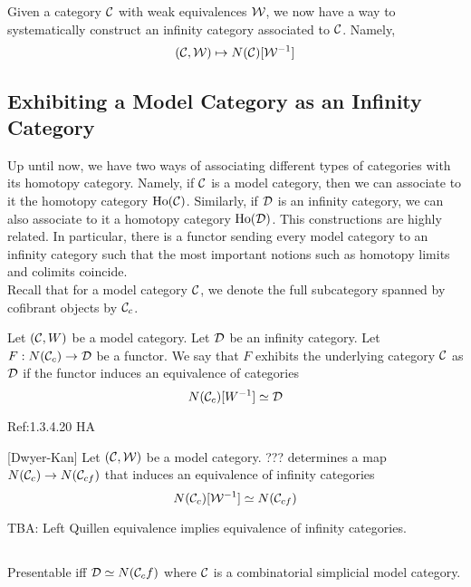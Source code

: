 \documentclass[a4paper]{article}
\begin{document}
Given a category $\mathcal{C}$ with weak equivalences $\mathcal{W}$, we now have a way to systematically construct an infinity category associated to $\mathcal{C}$. Namely, $$(\mathcal{C},\mathcal{W})\mapsto N(\mathcal{C})[\mathcal{W}^{-1}]$$

\subsection{Exhibiting a Model Category as an Infinity Category}
Up until now, we have two ways of associating different types of categories with its homotopy category. Namely, if $\mathcal{C}$ is a model category, then we can associate to it the homotopy category $\text{Ho}(\mathcal{C})$. Similarly, if $\mathcal{D}$ is an infinity category, we can also associate to it a homotopy category $\text{Ho}(\mathcal{D})$. This constructions are highly related. In particular, there is a functor sending every model category to an infinity category such that the most important notions such as homotopy limits and colimits coincide. \\

Recall that for a model category $\mathcal{C}$, we denote the full subcategory spanned by cofibrant objects by $\mathcal{C}_c$. 

\begin{defn}{}{} Let $(\mathcal{C},W)$ be a model category. Let $\mathcal{D}$ be an infinity category. Let $F:N(\mathcal{C}_c)\to\mathcal{D}$ be a functor. We say that $F$ exhibits the underlying category $\mathcal{C}$ as $\mathcal{D}$ if the functor induces an equivalence of categories $$N(\mathcal{C}_c)[W^{-1}]\simeq\mathcal{D}$$
\end{defn}

Ref:1.3.4.20 HA

\begin{thm}{[Dwyer-Kan]}{} Let $(\mathcal{C},\mathcal{W})$ be a model category. ??? determines a map $N(\mathcal{C}_c)\to N(\mathcal{C}_{cf})$ that induces an equivalence of infinity categories $$N(\mathcal{C}_c)[\mathcal{W}^{-1}]\simeq N(\mathcal{C}_{cf})$$
\end{thm}

TBA: Left Quillen equivalence implies equivalence of infinity categories. 

\subsection{}
Presentable iff $\mathcal{D}\simeq N(\mathcal{C}_cf)$ where $\mathcal{C}$ is a combinatorial simplicial model category. 
\end{document}
